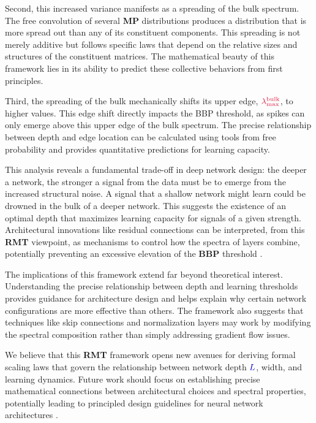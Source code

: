 \documentclass[a4paper]{article}
\theoremstyle{plain}
\theoremstyle{definition}
\theoremstyle{remark}
\begin{document}
Second, this increased variance manifests as a spreading of the bulk spectrum. The free convolution of several \textcolor{orange!80!black}{\textbf{MP}} distributions produces a distribution that is more spread out than any of its constituent components. This spreading is not merely additive but follows specific laws that depend on the relative sizes and structures of the constituent matrices. The mathematical beauty of this framework lies in its ability to predict these collective behaviors from first principles.

Third, the spreading of the bulk mechanically shifts its upper edge, $\textcolor{kernelcolor}{\lambda_{\max}^{\text{bulk}}}$, to higher values. This edge shift directly impacts the BBP threshold, as spikes can only emerge above this upper edge of the bulk spectrum. The precise relationship between depth and edge location can be calculated using tools from free probability and provides quantitative predictions for learning capacity.

\begin{tcolorbox}[colback=red!15,colframe=red!70!black,title={\textbf{⚡ PROFOUND CONSEQUENCE: Depth vs Signal Strength}},enhanced,drop shadow]
This analysis reveals a fundamental trade-off in deep network design: the deeper a network, the stronger a signal from the data must be to emerge from the increased structural noise. A signal that a shallow network might learn could be drowned in the bulk of a deeper network. This suggests the existence of an optimal depth that maximizes learning capacity for signals of a given strength. Architectural innovations like residual connections can be interpreted, from this \textcolor{purple!80!black}{\textbf{RMT}} viewpoint, as mechanisms to control how the spectra of layers combine, potentially preventing an excessive elevation of the \textcolor{orange!80!black}{\textbf{BBP}} threshold \cite{townsend2022sobolev}.
\end{tcolorbox}

The implications of this framework extend far beyond theoretical interest. Understanding the precise relationship between depth and learning thresholds provides guidance for architecture design and helps explain why certain network configurations are more effective than others. The framework also suggests that techniques like skip connections and normalization layers may work by modifying the spectral composition rather than simply addressing gradient flow issues.

\begin{tcolorbox}[colback=green!10,colframe=green!60!black,title={\textbf{🔬 FUTURE RESEARCH: Formal Scaling Laws}},enhanced,drop shadow]
We believe that this \textcolor{purple!80!black}{\textbf{RMT}} framework opens new avenues for deriving formal scaling laws that govern the relationship between network depth $\textcolor{blue!80!black}{L}$, width, and learning dynamics. Future work should focus on establishing precise mathematical connections between architectural choices and spectral properties, potentially leading to principled design guidelines for neural network architectures \cite{bach2017breaking}.
\end{tcolorbox}
\end{document}
